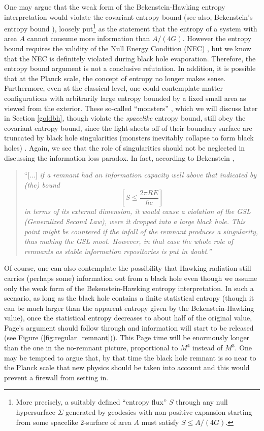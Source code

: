 \documentclass[12pt]{article}
\newcommand{\2}{$^2$}
\newcommand{\3}{$^3$}
\newcommand{\4}{$_4$}
\newcommand{\5}{$_5$}
\begin{document}
One may argue that the weak form of the Bekenstein-Hawking entropy interpretation would violate the covariant entropy bound \cite{Bousso:1999xy} (see also, Bekenstein's entropy bound \cite{287, 9307035}), loosely put\footnote{More precisely, a suitably defined ``entropy flux'' $S$ through any null hypersurface $\Sigma$ generated by geodesics with non-positive expansion starting from some spacelike 2-surface of area $A$ must satisfy $S\leqslant A/(4G)$.} as the statement that the entropy of a system with area $A$ cannot consume more information than $A/(4G)$. However the entropy bound requires the validity of the Null Energy Condition (NEC) \cite{FMW}, but we know that the NEC is definitely violated during black hole evaporation. Therefore, the entropy bound argument is not a conclusive refutation. In addition, it is possible that at the Planck scale, the concept of entropy no longer makes sense. 
Furthermore, even at the classical level, one could contemplate matter configurations with arbitrarily large entropy bounded by a fixed small area as viewed from the exterior. These so-called ``monsters'' \cite{hsu1,hsu2}, which we will discuss later in Section \ref{goldbh}, though violate the \emph{spacelike} entropy bound, still obey the covariant entropy bound, 
since the light-sheets off of their boundary surface are truncated by black hole singularities (monsters inevitably collapse to form black holes) \cite{hsu2, bousso}. Again, we see that the role of singularities should not be neglected in discussing the information loss paradox. In fact, according to Bekenstein \cite{9307035}, 
\begin{quote}
``[...]\emph{ if a remnant had an information capacity well above that indicated by (the) bound 
\begin{equation} \left[S \leqslant \frac{ 2\pi R E}{\hbar c}\right] \nonumber  \end{equation}
 in terms of its external
dimension, it would cause a violation of the GSL (Generalized Second Law), were it dropped into a large black hole. This point might be
countered if the infall of the remnant produces a singularity, thus making the GSL moot. However, in that case
the whole role of remnants as stable information repositories is put in doubt.''}
\end{quote}

Of course, one can also contemplate the possibility that Hawking radiation still carries (perhaps some) information out from a black hole even though we assume only the weak form of the Bekenstein-Hawking entropy interpretation. In such a scenario, as long as the black hole contains a finite statistical entropy (though it can be much larger than the apparent entropy given by the Bekenstein-Hawking value), once the statistical entropy decreases to about half of the original value, Page's argument should follow through and information will start to be released (see Figure (\ref{fig:regular_remnant})). This Page time will be enormously longer than the one in the no-remnant picture, proportional to $M^4$ instead of $M^3$. One may be tempted to argue that, by that time the black hole remnant is so near to the Planck scale that new physics should be taken into account and this would prevent a firewall from setting in. 
\end{document}
